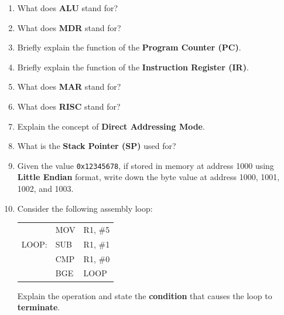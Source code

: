 \documentclass[a4paper,12pt]{article}
\begin{document}
\begin{enumerate}[label=\textbf{\arabic*.}]
    \item What does \textbf{ALU} stand for?
    \vspace{0.8cm}
    
    \item What does \textbf{MDR} stand for?
    \vspace{0.8cm}
    
    \item Briefly explain the function of the \textbf{Program Counter (PC)}.
    \vspace{0.8cm}

    \item Briefly explain the function of the \textbf{Instruction Register (IR)}.
    \vspace{0.8cm}

    \item What does \textbf{MAR} stand for?
    \vspace{0.8cm}
    
    \item What does \textbf{RISC} stand for?
    \vspace{0.8cm}

    \item Explain the concept of \textbf{Direct Addressing Mode}.
    \vspace{0.8cm}

    \item What is the \textbf{Stack Pointer (SP)} used for?
    \vspace{0.8cm}

    \item Given the value \texttt{0x12345678}, if stored in memory at address 1000 using \textbf{Little Endian} format, write down the byte value at address 1000, 1001, 1002, and 1003.
    \vspace{0.8cm}

    \item Consider the following assembly loop:
    \begin{center}
    \begin{tabular}{lll}
          & MOV & R1, \#5 \\
    LOOP: & SUB & R1, \#1 \\
          & CMP & R1, \#0 \\
          & BGE & LOOP
    \end{tabular}
    \end{center}
    Explain the operation and state the \textbf{condition} that causes the loop to \textbf{terminate}.
    \vspace{1.5cm}
\end{enumerate}
\end{document}
